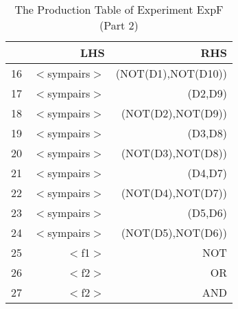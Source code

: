 \begin{table}[ht]
\centering
\begin{tabular}{rrr}
  \hline
 & LHS & RHS \\ 
  \hline
16 & $<$sympairs$>$ & (NOT(D1),NOT(D10)) \\ 
  17 & $<$sympairs$>$ & (D2,D9) \\ 
  18 & $<$sympairs$>$ & (NOT(D2),NOT(D9)) \\ 
  19 & $<$sympairs$>$ & (D3,D8) \\ 
  20 & $<$sympairs$>$ & (NOT(D3),NOT(D8)) \\ 
  21 & $<$sympairs$>$ & (D4,D7) \\ 
  22 & $<$sympairs$>$ & (NOT(D4),NOT(D7)) \\ 
  23 & $<$sympairs$>$ & (D5,D6) \\ 
  24 & $<$sympairs$>$ & (NOT(D5),NOT(D6)) \\ 
  25 & $<$f1$>$ & NOT \\ 
  26 & $<$f2$>$ & OR \\ 
  27 & $<$f2$>$ & AND \\ 
   \hline
\end{tabular}
\caption{The Production Table of Experiment ExpF (Part 2)} 
\end{table}
